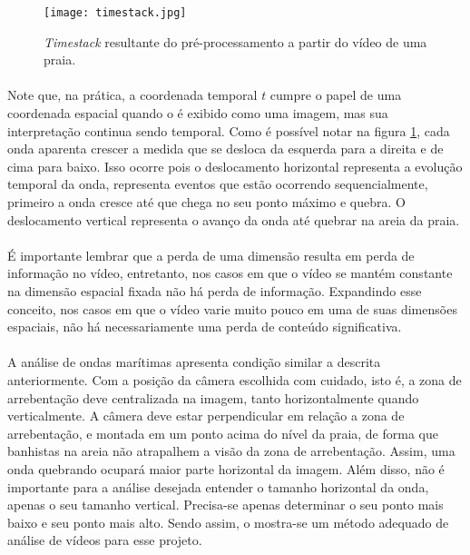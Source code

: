\begin{figure}[h]
\begin{center}
  \texttt{[image: timestack.jpg]}
  \caption[\small{\textit{Timestack} resultante do pré-processamento a partir do vídeo de uma praia.}]{\small{\textit{Timestack} resultante do pré-processamento a partir do vídeo de uma praia.}}
  \label{FigTimestack}
\end{center}
\end{figure}

\paragraph{}Note que, na prática, a coordenada temporal \(t\) cumpre o papel de uma coordenada espacial quando o \timestack é exibido como uma imagem, mas sua interpretação continua sendo temporal. Como é possível notar na figura \ref{FigTimestack}, cada onda aparenta crescer a medida que se desloca da esquerda para a direita e de cima para baixo. Isso ocorre pois o deslocamento horizontal representa a evolução temporal da onda, representa eventos que estão ocorrendo sequencialmente, primeiro a onda cresce até que chega no seu ponto máximo e quebra. O deslocamento vertical representa o avanço da onda até quebrar na areia da praia.

\paragraph{}É importante lembrar que a perda de uma dimensão resulta em perda de informação no vídeo, entretanto, nos casos em que o vídeo se mantém constante na dimensão espacial fixada não há perda de informação. Expandindo esse conceito, nos casos em que o vídeo varie muito pouco em uma de suas dimensões espaciais, não há necessariamente uma perda de conteúdo significativa.

\paragraph{}A análise de ondas marítimas apresenta condição similar a descrita anteriormente. Com a posição da câmera escolhida com cuidado, isto é, a zona de arrebentação deve centralizada na imagem, tanto horizontalmente quando verticalmente. A câmera deve estar perpendicular em relação a zona de arrebentação, e montada em um ponto acima do nível da praia, de forma que banhistas na areia não atrapalhem a visão da zona de arrebentação. Assim, uma onda quebrando ocupará maior parte horizontal da imagem. Além disso, não é importante para a análise desejada entender o tamanho horizontal da onda, apenas o seu tamanho vertical. Precisa-se apenas determinar o seu ponto mais baixo e seu ponto mais alto. Sendo assim, o \timestack mostra-se um método adequado de análise de vídeos para esse projeto.

